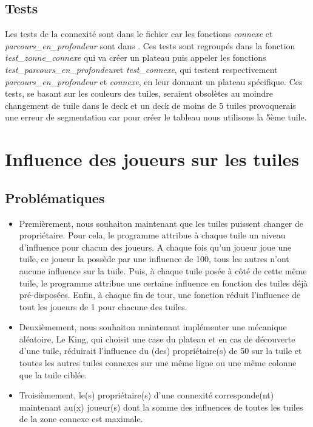 \documentclass[a4paper]{article}
\begin{document}
\subsection{Tests}

Les tests de la connexité sont dans le fichier  car les fonctions \emph{connexe} et \emph{parcours\_en\_profondeur} sont dans . Ces tests sont regroupés dans la fonction \emph{test\_zonne\_connexe} qui va créer un plateau puis appeler les fonctions \emph{test\_parcours\_en\_profondeur}et \emph{test\_connexe}, qui testent respectivement \emph{parcours\_en\_profondeur} et \emph{connexe}, en leur donnant un plateau spécifique. Ces tests, se basant sur les couleurs des tuiles, seraient obsolètes au moindre changement de tuile dans le deck et un deck de moins de 5 tuiles provoquerais une erreur de segmentation car pour créer le tableau nous utilisons la 5ème tuile.  

\section{Influence des joueurs sur les tuiles}
\subsection{Problématiques}
\begin{itemize}
    \item Premièrement, nous souhaiton maintenant que les tuiles puissent changer de propriétaire. Pour cela, le programme attribue à chaque tuile un niveau d'influence pour chacun des joueurs. A chaque fois qu'un joueur joue une tuile, ce joueur la possède par une influence de 100, tous les autres n'ont aucune influence sur la tuile. Puis, à chaque tuile posée à côté de cette même tuile, le programme attribue une certaine influence en fonction des tuiles déjà pré-disposées. Enfin, à chaque fin de tour, une fonction réduit l'influence de tout les joueurs de 1 pour chacune des tuiles. \\
    
    \item Deuxièmement, nous souhaiton maintenant implémenter une mécanique aléatoire, Le King, qui choisit une case du plateau et en cas de découverte d'une tuile, réduirait l'influence du (des) propriétaire(s) de 50 sur la tuile et toutes les autres tuiles connexes sur une même ligne ou une même colonne que la tuile ciblée. \\
    
    \item Troisièmement, le(s) propriétaire(s) d'une connexité corresponde(nt) maintenant au(x) joueur(s) dont la somme des influences de toutes les tuiles de la zone connexe est maximale.
\end{itemize}
\end{document}
